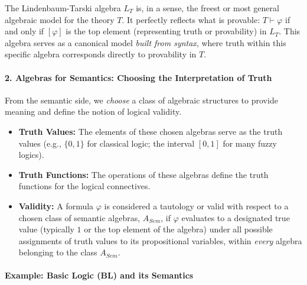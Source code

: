 The Lindenbaum-Tarski algebra $L_T$ is, in a sense, the freest or most general algebraic model for the theory $T$. It perfectly reflects what is provable: $T \vdash \varphi$ if and only if $[\varphi]$ is the top element (representing truth or provability) in $L_T$. This algebra serves as a canonical model \emph{built from syntax}, where truth within this specific algebra corresponds directly to provability in $T$.

\paragraph{2. Algebras for Semantics: Choosing the Interpretation of Truth}

From the semantic side, we \emph{choose} a class of algebraic structures to provide meaning and define the notion of logical validity.

\begin{itemize}
\item \textbf{Truth Values:} The elements of these chosen algebras serve as the truth values (e.g., $\{0,1\}$ for classical logic; the interval $[0,1]$ for many fuzzy logics).
\item \textbf{Truth Functions:} The operations of these algebras define the truth functions for the logical connectives.
\item \textbf{Validity:} A formula $\varphi$ is considered a tautology or valid with respect to a chosen class of semantic algebras, $A_{Sem}$, if $\varphi$ evaluates to a designated true value (typically $1$ or the top element of the algebra) under all possible assignments of truth values to its propositional variables, within \emph{every} algebra belonging to the class $A_{Sem}$.
\end{itemize}

\paragraph{Example: Basic Logic (BL) and its Semantics}

